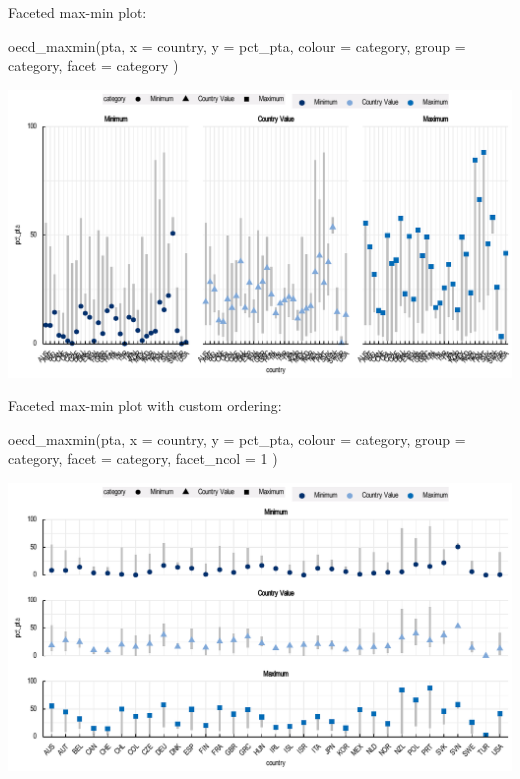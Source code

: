 \documentclass[
  11pt,
  oneside]{report}
\newenvironment{Shaded}{\begin{snugshade}}{\end{snugshade}}
\newcommand{\AttributeTok}[1]{\textcolor[rgb]{0.77,0.63,0.00}{#1}}
\newcommand{\DecValTok}[1]{\textcolor[rgb]{0.00,0.00,0.81}{#1}}
\newcommand{\FunctionTok}[1]{\textcolor[rgb]{0.00,0.00,0.00}{#1}}
\newcommand{\NormalTok}[1]{#1}
\begin{document}
Faceted max-min plot:

\begin{Shaded}
\begin{Highlighting}[]
\FunctionTok{oecd\_maxmin}\NormalTok{(pta,}
  \AttributeTok{x =}\NormalTok{ country, }\AttributeTok{y =}\NormalTok{ pct\_pta, }\AttributeTok{colour =}\NormalTok{ category, }\AttributeTok{group =}\NormalTok{ category,}
  \AttributeTok{facet =}\NormalTok{ category}
\NormalTok{)}
\end{Highlighting}
\end{Shaded}

\begin{center}\includegraphics{book_figures/sm2-1} \end{center}

Faceted max-min plot with custom ordering:

\begin{Shaded}
\begin{Highlighting}[]
\FunctionTok{oecd\_maxmin}\NormalTok{(pta,}
  \AttributeTok{x =}\NormalTok{ country, }\AttributeTok{y =}\NormalTok{ pct\_pta, }\AttributeTok{colour =}\NormalTok{ category, }\AttributeTok{group =}\NormalTok{ category,}
  \AttributeTok{facet =}\NormalTok{ category, }\AttributeTok{facet\_ncol =} \DecValTok{1}
\NormalTok{)}
\end{Highlighting}
\end{Shaded}

\begin{center}\includegraphics{book_figures/sm3-1} \end{center}
\end{document}
